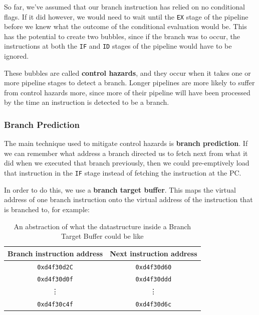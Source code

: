 So far, we've assumed that our branch instruction has relied on no conditional
flags. If it did however, we would need to wait until the \texttt{EX} stage of
the pipeline before we knew what the outcome of the conditional evaluation would
be. This has the potential to create two bubbles, since if the branch was to
occur, the instructions at both the \texttt{IF} and \texttt{ID} stages of the
pipeline would have to be ignored.


These bubbles are called \textbf{control hazards}, and they occur when it takes
one or more pipeline stages to detect a branch. Longer pipelines are more likely
to suffer from control hazards more, since more of their pipeline will have been
processed by the time an instruction is detected to be a branch.

\subsubsection{Branch Prediction}

The main technique used to mitigate control hazards is \textbf{branch
prediction}. If we can remember what address a branch directed us to fetch next
from what it did when we executed that branch previously, then we could
pre-emptively load that instruction in the \texttt{IF} stage instead of fetching
the instruction at the PC.

In order to do this, we use a \textbf{branch target buffer}. This maps the
virtual address of one branch instruction onto the virtual address of the
instruction that is branched to, for example:

\begin{table}[ht]
  \centering
  \begin{tabular}{|c|c|}
    \hline
    \textbf{Branch instruction address} & \textbf{Next instruction address} \\ \hline
    \texttt{0xd4f30d2C} & \texttt{0xd4f30d60} \\ \hline
    \texttt{0xd4f30d0f} & \texttt{0xd4f30ddd} \\ \hline
    \multicolumn{1}{c}{\vdots} & \multicolumn{1}{c}{\vdots\vspace{0.2em}}\\ \hline
    \texttt{0xd4f30c4f} & \texttt{0xd4f30d6c} \\ \hline
  \end{tabular}
  \caption{An abstraction of what the datastructure inside a Branch Target
  Buffer could be like}
\end{table}

